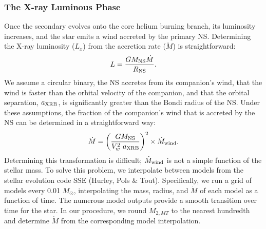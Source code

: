 \documentclass[12pt, preprint]{aastex}
\newcommand{\Msun}{\ifmmode {M_{\odot}}\else${M_{\odot}}$\fi}
\begin{document}

\subsubsection{The X-ray Luminous Phase} \label{sec:trans_XRB}

Once the secondary evolves onto the core helium burning branch, its luminosity increases, and the star emits a wind accreted by the primary NS. Determining the X-ray luminosity ($L_x$) from the accretion rate ($\dot{M}$) is straightforward: 
\begin{equation}
L = \frac{G M_{\rm NS} \dot{M}}{R_{\rm NS}}.
\end{equation}
We assume a circular binary, the NS accretes from its companion's wind, that the wind is faster than the orbital velocity of the companion, and that the orbital separation, $a_{\rm XRB}$, is significantly greater than the Bondi radius of the NS. Under these assumptions, the fraction of the companion's wind that is accreted by the NS can be determined in a straightforward way:
\begin{equation}
\dot{M} = \left( \frac{G M_{\rm NS}}{V_w^2\ a_{\rm XRB}} \right)^2 \times \dot{M}_{\rm wind}. \label{eq:mdot}
\end{equation}
Determining this transformation is difficult; $\dot{M}_{\rm wind}$ is not a simple function of the stellar mass. To solve this problem, we interpolate between models from the stellar evolution code SSE (Hurley, Pols \& Tout). Specifically, we run a grid of models every 0.01 \Msun, interpolating the mass, radius, and $\dot{M}$ of each model as a function of time. The numerous model outputs provide a smooth transition over time for the star. In our procedure, we round $M_{2,MT}$ to the nearest hundredth and determine $\dot{M}$ from the corresponding model interpolation.



\end{document}
